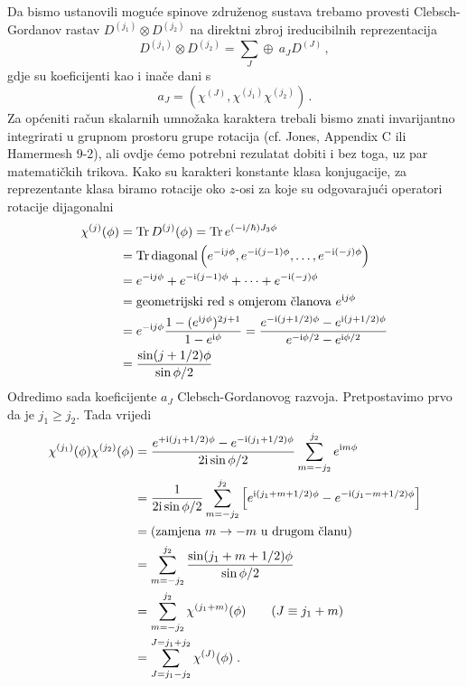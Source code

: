 Da bismo ustanovili moguće spinove združenog sustava trebamo
provesti Clebsch-Gordanov rastav $D^{(j_1)}\otimes D^{(j_2)}$ na direktni
zbroj ireducibilnih reprezentacija
\begin{displaymath}
  D^{(j_1)}\otimes D^{(j_2)} =
  \sum_J \oplus\: a_{J}D^{(J)} \,,
\end{displaymath}
gdje su koeficijenti kao i inače dani s
\begin{displaymath}
a_J = \left( \chi^{(J)}, \chi^{(j_1)} \chi^{(j_2)} \right) \,.
\end{displaymath}
Za općeniti račun skalarnih umnožaka karaktera trebali bismo
znati invarijantno integrirati u grupnom prostoru grupe rotacija (cf. Jones,
Appendix C ili Hamermesh 9-2), ali ovdje ćemo potrebni rezulatat
dobiti i bez toga, uz par matematičkih trikova.
Kako su karakteri konstante klasa konjugacije, za reprezentante 
klasa biramo rotacije oko $z$-osi za koje su odgovarajući operatori
rotacije dijagonalni
\begin{equation}
\begin{split}
 \chi^{(j)}(\phi) &= \operatorname{Tr} D^{(j)}(\phi) = \operatorname{Tr} e^{(-\textrm{i}/\hbar)J_3 \phi} \\
 &= \operatorname{Tr} \textrm{diagonal}\left( e^{-\textrm{i} j\phi }, e^{-\textrm{i} (j-1)\phi}, \ldots,
e^{-\textrm{i}(-j)\phi}\right)\\
&= e^{-\textrm{i} j\phi } + e^{-\textrm{i} (j-1)\phi} + \cdots + e^{-\textrm{i}(-j)\phi}\\
&= \text{geometrijski red s omjerom članova $e^{\textrm{i} j\phi}$} \\
&= e^{-\textrm{i} j\phi} \frac{1- (e^{\textrm{i} j\phi})^{2j+1}}{1-e^{\textrm{i}\phi}}
= \frac{e^{-\textrm{i}(j+1/2)\phi} - e^{\textrm{i}(j+1/2)\phi}}{e^{-\textrm{i}\phi/2}-e^{\textrm{i}\phi/2}}\\
&= \frac{\sin(j+1/2)\phi}{\sin\phi/2}
\end{split}
\end{equation}
Odredimo sada koeficijente $a_J$ Clebsch-Gordanovog razvoja. Pretpostavimo
prvo da je $j_1 \ge j_2$. Tada vrijedi
\begin{equation}
\begin{split}
\chi^{(j_1)}(\phi)\chi^{(j_2)}(\phi)&=
 \frac{e^{+\textrm{i}(j_1+1/2)\phi} - e^{-\textrm{i}(j_1+1/2)\phi}}{2\textrm{i}\sin\phi/2}
\sum_{m=-j_2}^{j_2}e^{\textrm{i} m \phi}\\
&= \frac{1}{2 \textrm{i} \sin\phi/2} \sum_{m=-j_2}^{j_2}
\left[ e^{\textrm{i}(j_1+m+1/2)\phi} - e^{-\textrm{i}(j_1-m+1/2)\phi}\right]\\
&= (\text{zamjena $m\to -m$ u drugom članu}) \\
&=\sum_{m=-j_2}^{j_2} \frac{\sin(j_1+m+1/2)\phi}{\sin\phi/2}\\
&=\sum_{m=-j_2}^{j_2} \chi^{(j_1 + m)}(\phi) \qquad (J\equiv j_1 +m) \\
&=\sum_{J=j_1-j_2}^{J=j_1+j_2} \chi^{(J)}(\phi) \;.
\end{split}
\end{equation}
